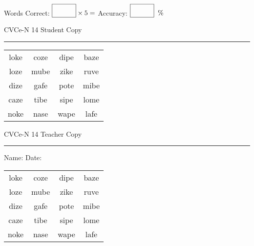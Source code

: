 \documentclass{memoir}
\begin{document}
\small

Words Correct: $\fbox{\phantom{\huge 100}} \times 5 = $ Accuracy: $\fbox{\phantom{\huge 100}}\;\; \%$ 

\vfill

\newpage


\footnotesize \noindent
CVCe-N 14 \hfill Student Copy
\smallskip
\hrule

\Large

\setlength{\tabcolsep}{14pt}
\def\arraystretch{2}

{\selectfont


\begin{vplace}[0.5]
\begin{center}
\begin{tabular}{cccc}
loke & coze & dipe & baze \\
loze & mube & zike & ruve \\
dize & gafe & pote & mibe \\
caze & tibe & sipe & lome \\
noke & nase & wape & lafe \\
\end{tabular}
\end{center}
\end{vplace}

}

\newpage

\footnotesize \noindent
CVCe-N 14 \hfill Teacher Copy
\smallskip
\hrule

\small

\vfill

\noindent
Name: \underline{\hspace{1.75in}} \hfill Date: \underline{\hspace{1in}}

\Large

{\selectfont


\begin{vplace}[0.5]
\begin{center}
\begin{tabular}{cccc}
loke & coze & dipe & baze \\
loze & mube & zike & ruve \\
dize & gafe & pote & mibe \\
caze & tibe & sipe & lome \\
noke & nase & wape & lafe \\
\end{tabular}
\end{center}
\end{vplace}



}
\end{document}

